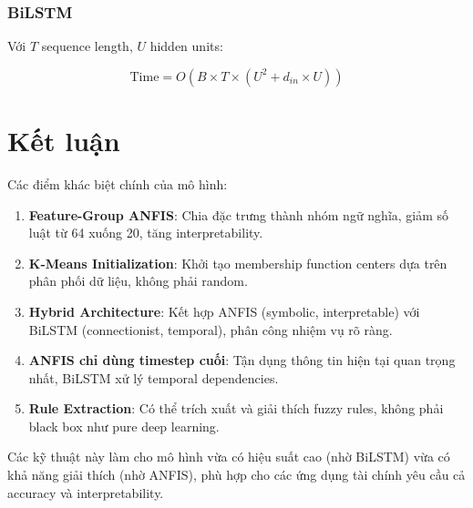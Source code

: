 \documentclass[12pt,a4paper]{article}
\begin{document}
\subsubsection{BiLSTM}

Với $T$ sequence length, $U$ hidden units:

\begin{equation}
\text{Time} = O(B \times T \times (U^2 + d_{in} \times U))
\end{equation}

\section{Kết luận}

Các điểm khác biệt chính của mô hình:

\begin{enumerate}
    \item \textbf{Feature-Group ANFIS}: Chia đặc trưng thành nhóm ngữ nghĩa, giảm số luật từ 64 xuống 20, tăng interpretability.
    \item \textbf{K-Means Initialization}: Khởi tạo membership function centers dựa trên phân phối dữ liệu, không phải random.
    \item \textbf{Hybrid Architecture}: Kết hợp ANFIS (symbolic, interpretable) với BiLSTM (connectionist, temporal), phân công nhiệm vụ rõ ràng.
    \item \textbf{ANFIS chỉ dùng timestep cuối}: Tận dụng thông tin hiện tại quan trọng nhất, BiLSTM xử lý temporal dependencies.
    \item \textbf{Rule Extraction}: Có thể trích xuất và giải thích fuzzy rules, không phải black box như pure deep learning.
\end{enumerate}

Các kỹ thuật này làm cho mô hình vừa có hiệu suất cao (nhờ BiLSTM) vừa có khả năng giải thích (nhờ ANFIS), phù hợp cho các ứng dụng tài chính yêu cầu cả accuracy và interpretability.
\end{document}
